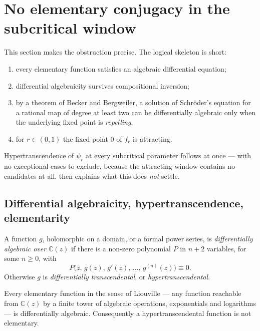 \section{No elementary conjugacy in the subcritical window}
\label{a:sec:ht}

This section makes the obstruction precise. The logical skeleton is short:
\begin{enumerate}[label=(\roman*),leftmargin=*]
\item every elementary function satisfies an algebraic differential equation;
\item differential algebraicity survives compositional inversion;
\item by a theorem of Becker and Bergweiler, a solution of Schröder's equation for
      a rational map of degree at least two can be differentially algebraic only
      when the underlying fixed point is \emph{repelling};
\item for $r\in(0,1)$ the fixed point $0$ of $f_r$ is attracting.
\end{enumerate}
Hypertranscendence of $\psi_r$ at every subcritical parameter follows at once ---
with no exceptional cases to exclude, because the attracting window contains no
candidates at all.  then explains what this
does \emph{not} settle.

\subsection{Differential algebraicity, hypertranscendence, elementarity}
\label{a:sec:dadefs}

\begin{definition}
\label{a:def:da}
A function $g$, holomorphic on a domain, or a formal power series, is
\emph{differentially algebraic over $\mathbb C(z)$} if there is a non-zero
polynomial $P$ in $n+2$ variables, for some $n\ge0$, with
\begin{equation}
\label{a:eq:dadef}
P\bigl(z,\,g(z),\,g'(z),\,\dots,\,g^{(n)}(z)\bigr)\equiv0 .
\end{equation}
Otherwise $g$ is \emph{differentially transcendental}, or
\emph{hypertranscendental}.
\end{definition}

\begin{lemma}
\label{a:lem:elemda}
Every elementary function in the sense of Liouville --- any function reachable from
$\mathbb C(z)$ by a finite tower of algebraic operations, exponentials and
logarithms --- is differentially algebraic. Consequently a hypertranscendental
function is not elementary.
\end{lemma}

